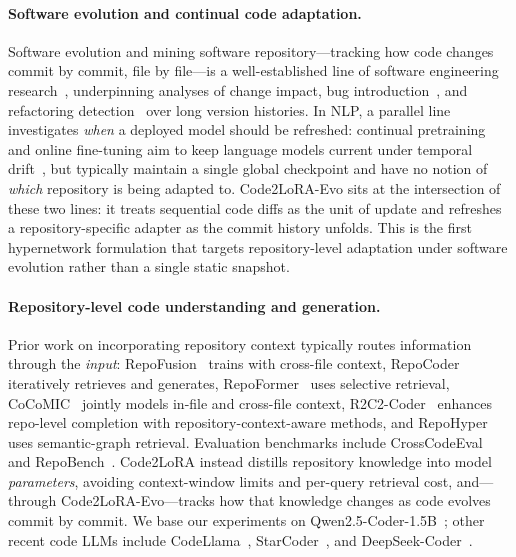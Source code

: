 \documentclass{llmxive}
\providecommand{\codelora}{Code2LoRA\xspace}
\providecommand{\codeloraevo}{\codelora-Evo\xspace}
\begin{document}
\paragraph{Software evolution and continual code adaptation.}
Software evolution and mining software repository---tracking how code changes commit by commit, file by file---is a well-established line of software engineering research~\cite{kagdi2007survey,hassan2008road}, underpinning analyses of change impact, bug introduction~\cite{sliwerski2005when}, and refactoring detection~\cite{tsantalis2018refdiff} over long version histories.
In NLP, a parallel line investigates \emph{when} a deployed model should be refreshed: continual pretraining and online fine-tuning aim to keep language models current under temporal drift~\cite{lazaridou2021mind,jang2022continual}, but typically maintain a single global checkpoint and have no notion of \emph{which} repository is being adapted to.
\codeloraevo{} sits at the intersection of these two lines: it treats sequential code diffs as the unit of update and refreshes a repository-specific adapter as the commit history unfolds.
This is the first hypernetwork formulation that targets repository-level adaptation under software evolution rather than a single static snapshot.

\paragraph{Repository-level code understanding and generation.}
Prior work on incorporating repository context typically routes information through the \emph{input}: RepoFusion~\cite{shrivastava2023repofusion} trains with cross-file context, RepoCoder~\cite{zhang2023repocoder} iteratively retrieves and generates, RepoFormer~\cite{wu2024repoformer} uses selective retrieval, CoCoMIC~\cite{ding2024cocomic} jointly models in-file and cross-file context, R2C2-Coder~\cite{deng2024r2c2coder} enhances repo-level completion with repository-context-aware methods, and RepoHyper~\cite{phan2024repohypersearchexpandrefinesemanticgraphs} uses semantic-graph retrieval.
Evaluation benchmarks include CrossCodeEval~\cite{ding2024crosscodeeval} and RepoBench~\cite{liu2023repobenchbenchmarkingrepositorylevelcode}.
\codelora{} instead distills repository knowledge into model \emph{parameters}, avoiding context-window limits and per-query retrieval cost, and---through \codeloraevo{}---tracks how that knowledge changes as code evolves commit by commit.
We base our experiments on Qwen2.5-Coder-1.5B~\cite{hui2024qwen25coder}; other recent code LLMs include CodeLlama~\cite{roziere2023code}, StarCoder~\cite{li2023starcoder}, and DeepSeek-Coder~\cite{guo2024deepseekcoderlargelanguagemodel}.
\end{document}
